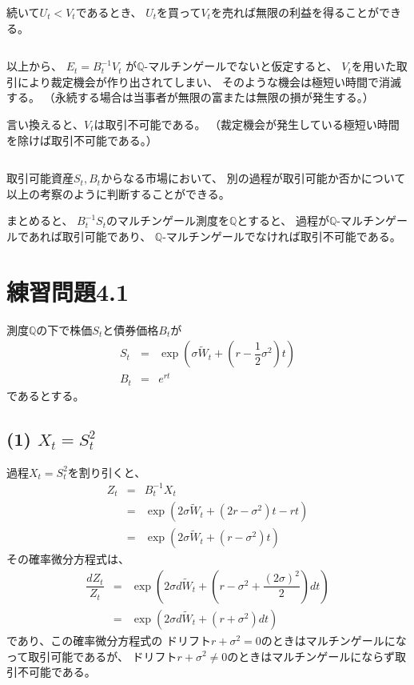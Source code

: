 \documentclass[uplatex,a4j,12pt,dvipdfmx]{jsarticle}
\begin{document}
続いて$U_{t} < V_{t}$であるとき、
$U_{t}$を買って$V_{t}$を売れば無限の利益を得ることができる。

${}$

以上から、
$E_{t} = B^{-1}_{t} V_{t}$
が$\mathbb{Q}$-マルチンゲールでないと仮定すると、
$V_{t}$を用いた取引により裁定機会が作り出されてしまい、
そのような機会は極短い時間で消滅する。
（永続する場合は当事者が無限の富または無限の損が発生する。）

言い換えると、$V_{t}$は取引不可能である。
（裁定機会が発生している極短い時間を除けば取引不可能である。）

${}$

取引可能資産$S_{t},B_{t}$からなる市場において、
別の過程が取引可能か否かについて以上の考察のように判断することができる。

まとめると、
$B^{-1}_{t} S_{t}$のマルチンゲール測度を$\mathbb{Q}$とすると、
過程が$\mathbb{Q}$-マルチンゲールであれば取引可能であり、
$\mathbb{Q}$-マルチンゲールでなければ取引不可能である。
\section*{練習問題4.1}

測度$\mathbb{Q}$の下で株価$S_{t}$と債券価格$B_{t}$が
%
%
\begin{eqnarray*}
	S_{t}
	&=&
	\exp \left(
	\sigma \tilde{W}_{t} +
	\left(
		r - \dfrac{1}{2} \sigma^{2}
		\right)
	t
	\right)
	\\
	B_{t}
	&=&
	e^{rt}
\end{eqnarray*}
%
%
であるとする。

\subsection*{(1) $X_{t} = S^{2}_{t}$}

過程$X_{t} = S^{2}_{t}$を割り引くと、
%
%
\begin{eqnarray*}
	Z_{t}
	&=&
	B^{-1}_{t} X_{t}
	\\ &=&
	\exp \left(
	2 \sigma \tilde{W}_{t} +
	\left(
		2 r - \sigma^{2}
		\right)
	t
	-rt
	\right)
	\\ &=&
	\exp \left(
	2 \sigma \tilde{W}_{t} +
	\left(
		r - \sigma^{2}
		\right)
	t
	\right)
\end{eqnarray*}
%
%
その確率微分方程式は、
%
%
\begin{eqnarray*}
	\dfrac{dZ_{t}}{Z_{t}}
	&=&
	\exp \left(
	2 \sigma d\tilde{W}_{t}
	+
	\left(
		r - \sigma^{2}
		+\dfrac{(2 \sigma)^{2}}{2}
		\right)
	dt
	\right)
	\\ &=&
	\exp \left(
	2 \sigma d\tilde{W}_{t}
	+
	\left(
		r + \sigma^{2}
		\right)
	dt
	\right)
\end{eqnarray*}
%
%
であり、この確率微分方程式の
ドリフト$r+\sigma^{2} = 0$のときはマルチンゲールになって取引可能であるが、
ドリフト$r+\sigma^{2} \neq 0$のときはマルチンゲールにならず取引不可能である。
\end{document}
